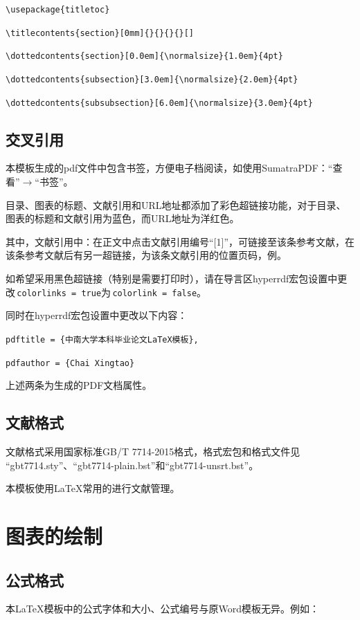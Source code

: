 \verb"\usepackage{titletoc}"

\verb"\titlecontents{section}[0mm]{}{}{}{}[]"

\verb"\dottedcontents{section}[0.0em]{\normalsize}{1.0em}{4pt}"

\verb"\dottedcontents{subsection}[3.0em]{\normalsize}{2.0em}{4pt}"

\verb"\dottedcontents{subsubsection}[6.0em]{\normalsize}{3.0em}{4pt}"

\subsection{交叉引用}
本模板生成的pdf文件中包含书签，方便电子档阅读，如使用SumatraPDF：“查看”$\to$“书签”。

目录、图表的标题、文献引用和URL地址都添加了彩色超链接功能，对于目录、图表的标题和文献引用为蓝色，而URL地址为洋红色。

其中，文献引用中：在正文中点击文献引用编号“[1]”，可链接至该条参考文献，在该条参考文献后有另一超链接，为该条文献引用的位置页码，例\cite{Meta_CN}。

如希望采用黑色超链接（特别是需要打印时），请在导言区hyperrdf宏包设置中更改\,\verb"colorlinks = true"为\,\verb"colorlink = false"。

同时在hyperrdf宏包设置中更改以下内容：

\verb"pdftitle = {中南大学本科毕业论文LaTeX模板},"

\verb"pdfauthor = {Chai Xingtao}"

上述两条为生成的PDF文档属性。

\subsection{文献格式}
文献格式采用国家标准GB/T 7714-2015格式，格式宏包和格式文件见\\
“gbt7714.sty”、“gbt7714-plain.bst”和“gbt7714-unsrt.bst”。

本模板使用\LaTeX 常用的\BibTeX 进行文献管理。

\newpage\vspace*{-21.6pt}
\section{图表的绘制}
\subsection{公式格式}
本\LaTeX 模板中的公式字体和大小、公式编号与原Word模板无异。例如：

